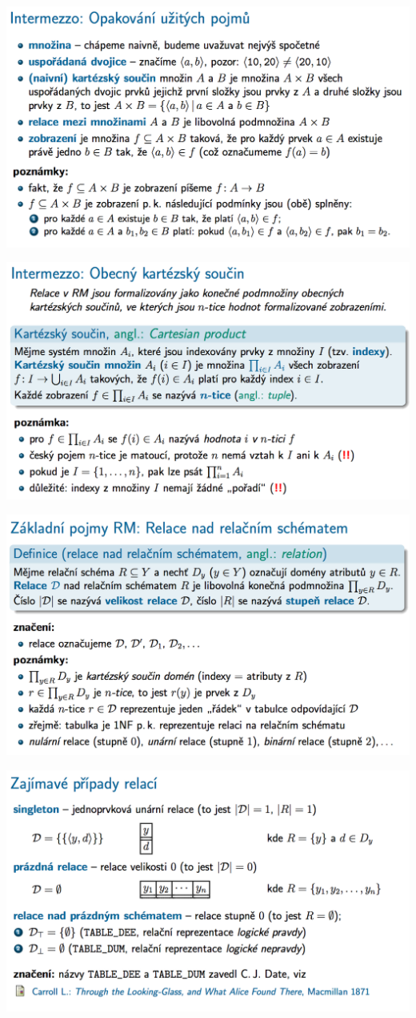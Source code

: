 \documentclass[10pt,a4paper]{article}
\begin{document}
	\includegraphics[scale=0.4]{img/13}
	
	\includegraphics[scale=0.4]{img/14}
	
	\includegraphics[scale=0.4]{img/15}
	
	\includegraphics[scale=0.4]{img/16}
	
\end{document}
